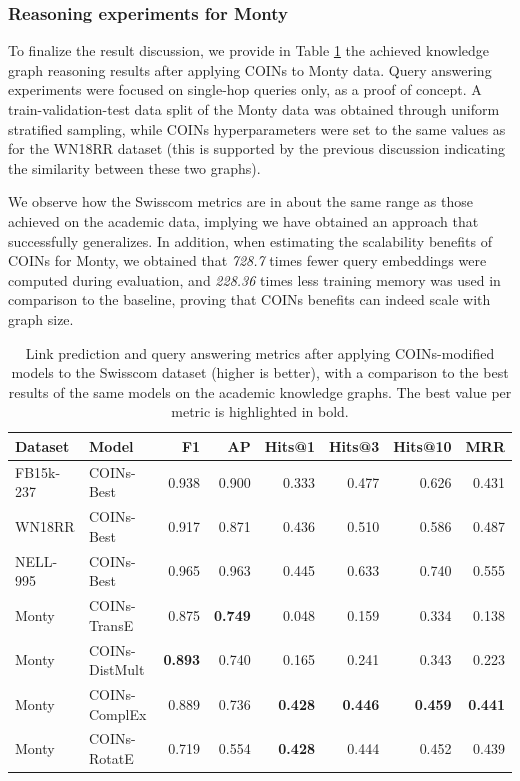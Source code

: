 \subsubsection{Reasoning experiments for Monty}

To finalize the result discussion, we provide in Table \ref{tab:swisscom_coins} the achieved knowledge graph reasoning results after applying COINs to Monty data. Query answering experiments were focused on single-hop queries only, as a proof of concept. A train-validation-test data split of the Monty data was obtained through uniform stratified sampling, while COINs hyperparameters were set to the same values as for the WN18RR dataset (this is supported by the previous discussion indicating the similarity between these two graphs). 

We observe how the Swisscom metrics are in about the same range as those achieved on the academic data, implying we have obtained an approach that successfully generalizes. In addition, when estimating the scalability benefits of COINs for Monty, we obtained that \emph{728.7} times fewer query embeddings were computed during evaluation, and \emph{228.36} times less training memory was used in comparison to the baseline, proving that COINs benefits can indeed scale with graph size.


\begin{table}[H]
    \centering
    \caption[Link prediction and query answering metrics after applying COINs-modified models to the Swisscom dataset.]{Link prediction and query answering metrics after applying COINs-modified models to the Swisscom dataset (higher is better), with a comparison to the best results of the same models on the academic knowledge graphs. The best value per metric is highlighted in bold.}
    \label{tab:swisscom_coins}
    \begin{adjustbox}{width=0.75\columnwidth}
    \begin{tabular}{llrrrrrr}
    \toprule
         Dataset & Model & F1 & AP & Hits@1 & Hits@3 & Hits@10 & MRR \\
    \midrule
         FB15k-237 & COINs-Best & 0.938 & 0.900 & 0.333 & 0.477 & 0.626 & 0.431 \\
         WN18RR & COINs-Best & 0.917 & 0.871 & 0.436 & 0.510 & 0.586 & 0.487 \\
         NELL-995 & COINs-Best & 0.965 & 0.963 & 0.445 & 0.633 & 0.740 & 0.555 \\
         \midrule
         Monty & COINs-TransE & 0.875 & \textbf{0.749} & 0.048 & 0.159 & 0.334 & 0.138 \\
         Monty & COINs-DistMult & \textbf{0.893} & 0.740 & 0.165 & 0.241 & 0.343 & 0.223 \\
         Monty & COINs-ComplEx & 0.889 & 0.736 & \textbf{0.428} & \textbf{0.446} & \textbf{0.459} & \textbf{0.441} \\
         Monty & COINs-RotatE & 0.719 & 0.554 & \textbf{0.428} & 0.444 & 0.452 & 0.439 \\
    \bottomrule
    \end{tabular}
    \end{adjustbox}
\end{table}

